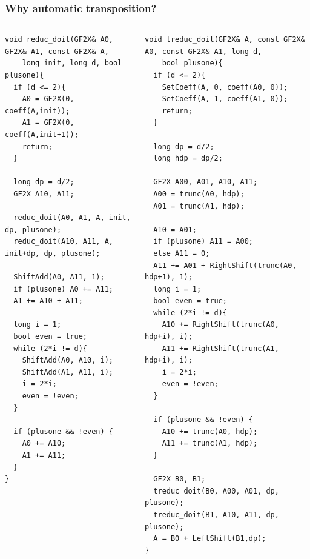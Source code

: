 \documentclass[10pt]{beamer}
\renewcommand{\emph}[1]{{\usebeamercolor[fg]{structure}#1}}
\begin{document}
\begin{frame}[fragile]
  \tiny
  \frametitle{Why \emph{automatic} transposition?}

  \begin{columns}
    \begin{column}{0.5\textwidth}
      \begin{center}
        \begin{minipage}{\textwidth}
\begin{verbatim}
void reduc_doit(GF2X& A0, GF2X& A1, const GF2X& A,
	long init, long d, bool plusone){
  if (d <= 2){
    A0 = GF2X(0, coeff(A,init));
    A1 = GF2X(0, coeff(A,init+1));
    return;
  }
   
  long dp = d/2;
  GF2X A10, A11;

  reduc_doit(A0, A1, A, init, dp, plusone);
  reduc_doit(A10, A11, A, init+dp, dp, plusone);
 
  ShiftAdd(A0, A11, 1);
  if (plusone) A0 += A11;
  A1 += A10 + A11;

  long i = 1;
  bool even = true;
  while (2*i != d){
    ShiftAdd(A0, A10, i);
    ShiftAdd(A1, A11, i);
    i = 2*i;
    even = !even;
  }
  
  if (plusone && !even) {
    A0 += A10;
    A1 += A11;
  }
}
\end{verbatim}
        \end{minipage}
      \end{center}
    \end{column}

    \begin{column}{0.5\textwidth}
      \begin{center}
        \begin{minipage}{\textwidth}
\begin{verbatim}
void treduc_doit(GF2X& A, const GF2X& A0, const GF2X& A1, long d,
	bool plusone){
  if (d <= 2){
    SetCoeff(A, 0, coeff(A0, 0));
    SetCoeff(A, 1, coeff(A1, 0));
    return;
  }
   
  long dp = d/2;
  long hdp = dp/2;

  GF2X A00, A01, A10, A11;
  A00 = trunc(A0, hdp);
  A01 = trunc(A1, hdp);

  A10 = A01;
  if (plusone) A11 = A00;
  else A11 = 0;
  A11 += A01 + RightShift(trunc(A0, hdp+1), 1);
  long i = 1;
  bool even = true;
  while (2*i != d){
    A10 += RightShift(trunc(A0, hdp+i), i);
    A11 += RightShift(trunc(A1, hdp+i), i);
    i = 2*i;
    even = !even;
  }
  
  if (plusone && !even) {
    A10 += trunc(A0, hdp);
    A11 += trunc(A1, hdp);
  }
  
  GF2X B0, B1;
  treduc_doit(B0, A00, A01, dp, plusone);
  treduc_doit(B1, A10, A11, dp, plusone);
  A = B0 + LeftShift(B1,dp);
}
\end{verbatim}
        \end{minipage}
      \end{center}
    \end{column}
    \end{columns}
\end{frame}
\end{document}
